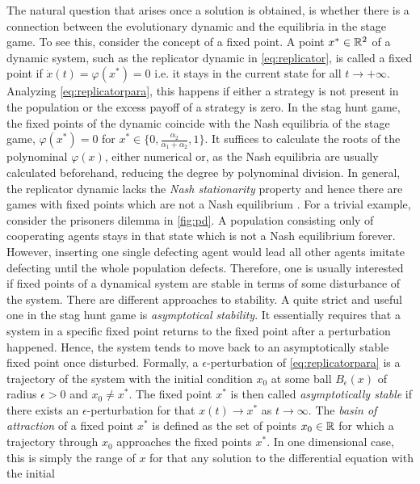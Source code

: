The natural question that arises once a solution is obtained, is whether there 
is a connection between the evolutionary dynamic and the equilibria in the 
stage game. To see this, consider the concept of a fixed point.
A point $x^* \in \mathbb{R}^2$ of a dynamic system, such as the replicator 
dynamic in \eqref{eq:replicator}, is called a fixed point
if $\dot{x}(t) = \varphi(x^*) = 0$ i.e. it stays in the current state for all 
$t \rightarrow + \infty $. 
Analyzing \eqref{eq:replicatorpara}, this happens if either a strategy
is not present in the population or the excess payoff of a strategy is zero. 
In the stag hunt game, the fixed points of the
dynamic coincide with the Nash equilibria of the stage game, 
$\varphi(x^*) = 0$ for $x^* \in \{0,\frac{\alpha_2}{\alpha_1+\alpha_2},1\}$. 
It suffices to calculate the roots of the polynominal $\varphi(x)$, either
numerical or, as the Nash equilibria are usually calculated beforehand,
reducing the degree by polynominal division. In general, the replicator 
dynamic lacks the \textit{Nash stationarity} property and hence there are 
games with fixed points which are not a Nash equilibrium
\parencite{sandholm_population_2010}.
For a trivial example, consider the prisoners dilemma in \ref{fig:pd}. 
A population consisting only of cooperating agents stays in that state
which is not a Nash equilibrium forever. However, inserting one single 
defecting agent would lead all other agents imitate defecting until the 
whole population defects.
Therefore, one is usually interested if fixed points of 
a dynamical system are stable in terms of some disturbance of the system. 
There are different approaches to stability. A quite strict and useful one 
in the stag hunt game is \textit{asymptotical stability}. 
It essentially requires that a system in a specific fixed point returns 
to the fixed point after a perturbation happened.
Hence, the system tends to move back to an asymptotically stable fixed point
once disturbed. Formally, a $\epsilon$-perturbation of 
\eqref{eq:replicatorpara} is a trajectory of the system with the initial
condition $x_0$ at some ball $B_\epsilon(x)$ of radius $\epsilon >0$ and 
$x_0 \neq x^*$. The fixed point $x^*$ is then called \textit{asymptotically
stable} if there exists an $\epsilon$-perturbation for that $x(t) \rightarrow
x^*$ as $t \rightarrow \infty$. 
The \textit{basin of attraction} of a fixed point $x^*$ is defined as the set 
of points $x_0 \in \mathbb{R}$ for which a trajectory through $x_0$ approaches 
the fixed points $x^*$. In one dimensional case, this is simply the range 
of $x$ for that any solution to the differential equation with the initial 
